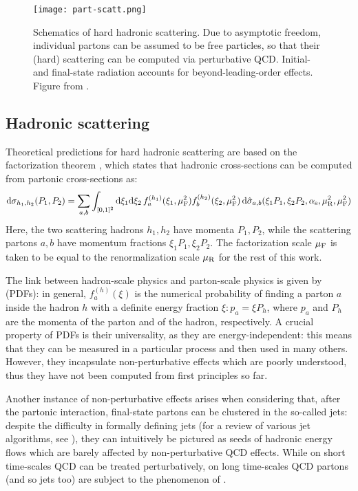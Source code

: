 \begin{figure}
  \centering
  \texttt{[image: part-scatt.png]}
  \caption{Schematics of hard hadronic scattering. Due to asymptotic freedom, individual partons can be assumed to be free particles, so that their (hard) scattering can be computed via perturbative QCD. Initial- and final-state radiation accounts for beyond-leading-order effects. Figure from \cite{Asteriadis-2020}.}
  \label{fig:part-scatt}
\end{figure}

\subsection{Hadronic scattering}

Theoretical predictions for hard hadronic scattering are based on the factorization theorem \cite{Collins-1989}, which states that hadronic cross-sections can be computed from partonic cross-sections as:
\begin{equation}
  \mathrm{d}\sigma_{h_1,h_2}(P_1 , P_2) = \sum_{a,b} \int_{[0,1]^2} \mathrm{d} \xi_1 \mathrm{d} \xi_2 \, f_a^{(h_1)}(\xi_1, \mu_\text{F}^2) f_b^{(h_2)}(\xi_2, \mu_\text{F}^2) \, \mathrm{d}\hat{\sigma}_{a,b}(\xi_1 P_1, \xi_2 P_2, \alpha_\text{s}, \mu_\text{R}^2, \mu_\text{F}^2)
  \label{eq:fact-th}
\end{equation}
Here, the two scattering hadrons $ h_1 , h_2 $ have momenta $ P_1 , P_2 $, while the scattering partons $ a , b $ have momentum fractions $ \xi_1 P_1 , \xi_2 P_2 $. The factorization scale $ \mu_\text{F} $ is taken to be equal to the renormalization scale $ \mu_\text{R} $ for the rest of this work.

The link between hadron-scale physics and parton-scale physics is given by  (PDFs): in general, $ f_a^{(h)}(\xi) $ is the numerical probability of finding a parton $ a $ inside the hadron $ h $ with a definite energy fraction $ \xi : p_a = \xi P_h $, where $ p_a $ and $ P_h $ are the momenta of the parton and of the hadron, respectively. A crucial property of PDFs is their universality, as they are energy-independent: this means that they can be measured in a particular process and then used in many others. However, they incapsulate non-perturbative effects which are poorly understood, thus they have not been computed from first principles so far.

Another instance of non-perturbative effects arises when considering that, after the partonic interaction, final-state partons can be clustered in the so-called jets: despite the difficulty in formally defining jets (for a review of various jet algorithms, see \cite{Salam-2010}), they can intuitively be pictured as seeds of hadronic energy flows which are barely affected by non-perturbative QCD effects. While on short time-scales QCD can be treated perturbatively, on long time-scales QCD partons (and so jets too) are subject to the phenomenon of .

